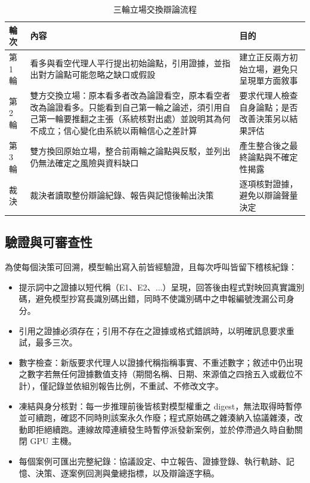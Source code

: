 \documentclass[12pt,a4paper]{article}
\begin{document}
\begin{CJK}{UTF8}{bkai}
\begin{table}[H]
\centering\small
\caption{三輪立場交換辯論流程}
\label{tab:rounds}
\begin{tabularx}{\textwidth}{@{}l Y Y@{}}
\toprule
輪次 & 內容 & 目的 \\
\midrule
第 1 輪 & 看多與看空代理人平行提出初始論點，引用證據，並指出對方論點可能忽略之缺口或假設 & 建立正反兩方初始立場，避免只呈現單方面敘事 \\
第 2 輪 & 雙方交換立場：原本看多者改為論證看空，原本看空者改為論證看多。只能看到自己第一輪之論述，須引用自己第一輪要推翻之主張（系統核對出處）並說明其為何不成立；信心變化由系統以兩輪信心之差計算 & 要求代理人檢查自身論點；是否改善決策另以結果評估 \\
第 3 輪 & 雙方換回原始立場，整合前兩輪之論點與反駁，並列出仍無法確定之風險與資料缺口 & 產生整合後之最終論點與不確定性揭露 \\
裁決 & 裁決者讀取整份辯論紀錄、報告與記憶後輸出決策 & 逐項核對證據，避免以辯論聲量決定 \\
\bottomrule
\end{tabularx}
\end{table}

\subsection{驗證與可審查性}

為使每個決策可回溯，模型輸出寫入前皆經驗證，且每次呼叫皆留下稽核紀錄：

\begin{itemize}
  \item 提示詞中之證據以短代稱（E1、E2、$\ldots$）呈現，回答後由程式對映回真實識別碼，避免模型抄寫長識別碼出錯，同時不使識別碼中之申報編號洩漏公司身分。
  \item 引用之證據必須存在；引用不存在之證據或格式錯誤時，以明確訊息要求重試，最多三次。
  \item 數字檢查：新版要求代理人以證據代稱指稱事實、不重述數字；敘述中仍出現之數字若無任何證據數值支持（期間名稱、日期、來源值之四捨五入或截位不計），僅記錄並依組別報告比例，不重試、不修改文字。
  \item 凍結與身分核對：每一步推理前後皆核對模型權重之 digest，無法取得時暫停並可續跑，確認不同時則該案永久作廢；程式原始碼之雜湊納入協議雜湊，改動即拒絕續跑。連線故障連續發生時暫停派發新案例，並於停滯過久時自動關閉 GPU 主機。
  \item 每個案例可匯出完整紀錄：協議設定、中立報告、證據登錄、執行軌跡、記憶、決策、逐案例回測與彙總指標，以及辯論逐字稿。
\end{itemize}


\end{CJK}
\end{document}
